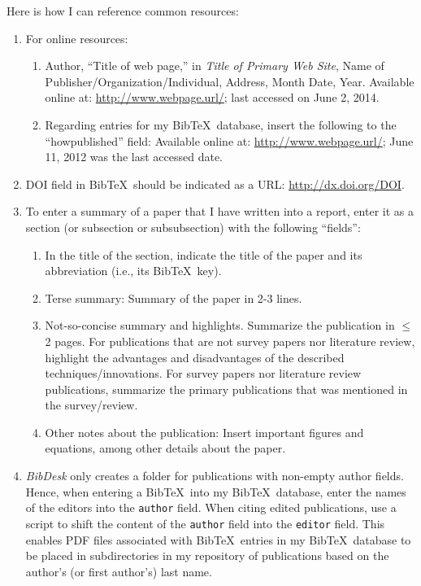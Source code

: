 Here is how I can reference common resources: \vspace{-0.3cm}
\begin{enumerate} \itemsep -4pt
\item For online resources: \vspace{-0.3cm}
	\begin{enumerate} \itemsep -2pt
	\item Author, ``Title of web page,'' in {\it Title of Primary Web Site}, Name of Publisher/Organization/Individual, Address, Month Date, Year. Available online at: \url{http://www.webpage.url/}; last accessed on June 2, 2014.	%
	\item Regarding entries for my {\sc Bib}\TeX\ database, insert the following to the ``howpublished'' field: Available online at: \url{http://www.webpage.url/}; June 11, 2012 was the last accessed date.	%
	\end{enumerate}
\item DOI field in {\sc Bib}\TeX\ should be indicated as a URL: \url{http://dx.doi.org/DOI}.	%
\item To enter a summary of a paper that I have written into a report, enter it as a section (or subsection or subsubsection) with the following ``fields'': \vspace{-0.3cm}
	\begin{enumerate} \itemsep -2pt
	\item In the title of the section, indicate the title of the paper and its abbreviation (i.e., its {\sc Bib}\TeX\ key).
	\item Terse summary: Summary of the paper in 2-3 lines.
	\item Not-so-concise summary and highlights. Summarize the publication in $\leq$ 2 pages. For publications that are not survey papers nor literature review, highlight the advantages and disadvantages of the described techniques/innovations. For survey papers nor literature review publications, summarize the primary publications that was mentioned in the survey/review.
	\item Other notes about the publication: Insert important figures and equations, among other details about the paper.
	\end{enumerate}
\item {\it BibDesk} only creates a folder for publications with non-empty author fields. Hence, when entering a {\sc Bib}\TeX\ into my {\sc Bib}\TeX\ database, enter the names of the editors into the {\tt author} field. {\color{red} When citing edited publications, use a script to shift the content of the {\tt author} field into the {\tt editor} field.} This enables PDF files associated with {\sc Bib}\TeX\ entries in my {\sc Bib}\TeX\ database to be placed in subdirectories in my repository of publications based on the author's (or first author's) last name.

\end{enumerate}
